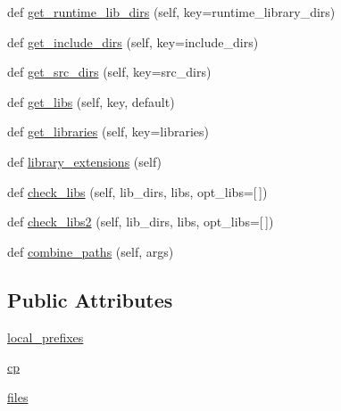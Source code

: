 \begin{DoxyCompactItemize}
\item 
def \hyperlink{classnumpy_1_1distutils_1_1system__info_1_1system__info_a6fd6afcf8619644846e44d75772f6da8}{get\+\_\+runtime\+\_\+lib\+\_\+dirs} (self, key=\textquotesingle{}runtime\+\_\+library\+\_\+dirs\textquotesingle{})
\item 
def \hyperlink{classnumpy_1_1distutils_1_1system__info_1_1system__info_a1b2075d6cdec79d91923da62a00343f1}{get\+\_\+include\+\_\+dirs} (self, key=\textquotesingle{}include\+\_\+dirs\textquotesingle{})
\item 
def \hyperlink{classnumpy_1_1distutils_1_1system__info_1_1system__info_aa0e51b31388f3307c2c49f9815bd0c3e}{get\+\_\+src\+\_\+dirs} (self, key=\textquotesingle{}src\+\_\+dirs\textquotesingle{})
\item 
def \hyperlink{classnumpy_1_1distutils_1_1system__info_1_1system__info_a85b2a69d9d29ced77bbc9bb0adbe4e59}{get\+\_\+libs} (self, key, default)
\item 
def \hyperlink{classnumpy_1_1distutils_1_1system__info_1_1system__info_a0a9082c17d90a16adf18dc5ace25b91f}{get\+\_\+libraries} (self, key=\textquotesingle{}libraries\textquotesingle{})
\item 
def \hyperlink{classnumpy_1_1distutils_1_1system__info_1_1system__info_a336b06d686ab443c7ddb50e6b9f8a1af}{library\+\_\+extensions} (self)
\item 
def \hyperlink{classnumpy_1_1distutils_1_1system__info_1_1system__info_a1adfb3fe6470812f2be223bc4217f937}{check\+\_\+libs} (self, lib\+\_\+dirs, libs, opt\+\_\+libs=\mbox{[}$\,$\mbox{]})
\item 
def \hyperlink{classnumpy_1_1distutils_1_1system__info_1_1system__info_a42b02a737fb33cb4b3d1820258ec4ea9}{check\+\_\+libs2} (self, lib\+\_\+dirs, libs, opt\+\_\+libs=\mbox{[}$\,$\mbox{]})
\item 
def \hyperlink{classnumpy_1_1distutils_1_1system__info_1_1system__info_a1faebaa362458f77b2a14a06a80fabfa}{combine\+\_\+paths} (self, args)
\end{DoxyCompactItemize}
\subsection*{Public Attributes}
\begin{DoxyCompactItemize}
\item 
\hyperlink{classnumpy_1_1distutils_1_1system__info_1_1system__info_a41a663fe71befbc43358564da32b26c0}{local\+\_\+prefixes}
\item 
\hyperlink{classnumpy_1_1distutils_1_1system__info_1_1system__info_ad2143d3fb001c9671977ca8093416525}{cp}
\item 
\hyperlink{classnumpy_1_1distutils_1_1system__info_1_1system__info_aee0204adaf81868401d16605569cc215}{files}
\end{DoxyCompactItemize}
